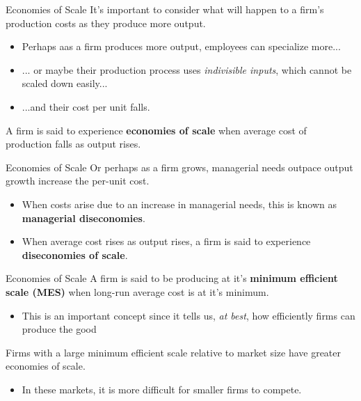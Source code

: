 \documentclass[11pt,t]{beamer}
\begin{document}
\begin{frame}{Economies of Scale}
  It's important to consider what will happen to a firm's production costs as they produce more output.

  \begin{itemize}
    \item Perhaps aas a firm produces more output, employees can specialize more...
    
    \item ... or maybe their production process uses \emph{indivisible inputs}, which cannot be scaled down easily...
    
    \item ...and their cost per unit falls.
  \end{itemize}
  
  \bigskip
  A firm is said to experience \textbf{economies of scale} when average cost of production falls as output rises.
\end{frame}

\begin{frame}{Economies of Scale}
  Or perhaps as a firm grows, managerial needs outpace output growth increase the per-unit cost.

  \bigskip
  \begin{itemize}
    \item When costs arise due to an increase in managerial needs, this is known as \textbf{managerial diseconomies}.
    
    \item When average cost rises as output rises, a firm is said to experience \textbf{diseconomies of scale}.
  \end{itemize}
\end{frame}

\begin{frame}{Economies of Scale}
  A firm is said to be producing at it's \textbf{minimum efficient scale (MES)} when long-run average cost is at it's minimum.

  \begin{itemize}
    \item This is an important concept since it tells us, \emph{at best}, how efficiently firms can produce the good
  \end{itemize}


  \bigskip\pause
  Firms with a large minimum efficient scale relative to market size have greater economies of scale.
    
  \begin{itemize}
    \item In these markets, it is more difficult for smaller firms to compete.
  \end{itemize}
\end{frame}
\end{document}
